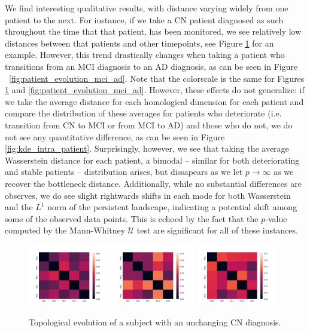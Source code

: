 \documentclass{article}
\begin{document}
We find interesting qualitative results, with distance varying widely from one patient to the next. For instance, if we take a CN patient diagnosed as such throughout the time that that patient, has been monitored, we see relatively low distances between that patients and other timepoints, see Figure \ref{fig:patient_evolution_stable} for an example. However, this trend drastically changes when taking a patient who transitions from an MCI diagnosis to an AD diagnosis, as can be seen in Figure ~\ref{fig:patient_evolution_mci_ad}. Note that the colorscale is the same for Figures \ref{fig:patient_evolution_stable} and \ref{fig:patient_evolution_mci_ad}. However, these effects do not generalize: if we take the average distance for each homological dimension for each patient and compare the distribution of these averages for patients who deteriorate (i.e. transition from CN to MCI or from MCI to AD) and those who do not, we do not see any quantitative difference, as can be seen in Figure \ref{fig:kde_intra_patient}. Surprisingly, however, we see that taking the average Wasserstein distance for each patient, a bimodal -- similar for both deteriorating and stable patients -- distribution arises, but dissapears as we let $p\to\infty$ as we recover the bottleneck distance. Additionally, while no substantial differences are observes, we do see slight rightwards shifts in each mode for both Wasserstein and the $L^1$ norm of the persistent landscape, indicating a potential shift among some of the observed data points. This is echoed by the fact that the $p$-value computed by the Mann-Whitney $\mathcal{U}$ test are significant for all of these instances.


\begin{figure}
  \centering
  \includegraphics[width=0.32\textwidth]{figures/temporal_evolution/ADNI011S0023_h_0.png}
  \hfill \includegraphics[width=0.32\textwidth]{figures/temporal_evolution/ADNI011S0023_h_1.png}
  \hfill \includegraphics[width=0.32\textwidth]{figures/temporal_evolution/ADNI011S0023_h_2.png}
  \caption{Topological evolution of a subject with an unchanging CN diagnosis.}
  \label{fig:patient_evolution_stable}
\end{figure}
\end{document}
